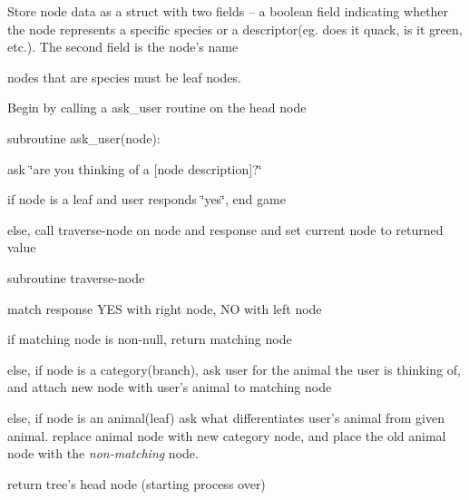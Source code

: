 \begin{DoxyItemize}
\item Store node data as a struct with two fields -- a boolean field indicating whether the node represents a specific species or a descriptor(eg. does it quack, is it green, etc.). The second field is the node's name
\begin{DoxyItemize}
\item nodes that are species must be leaf nodes.
\end{DoxyItemize}
\item Begin by calling a {\ttfamily ask\+\_\+user} routine on the head node
\item subroutine {\ttfamily ask\+\_\+user(node)}\+:
\begin{DoxyItemize}
\item ask \char`\"{}are you thinking of a \mbox{[}node description\mbox{]}?\char`\"{}
\item if node is a leaf and user responds \char`\"{}yes\char`\"{}, end game
\item else, call {\ttfamily traverse-\/node} on node and response and set current node to returned value
\end{DoxyItemize}
\item subroutine {\ttfamily traverse-\/node}
\begin{DoxyItemize}
\item match response Y\+E\+S with right node, N\+O with left node
\item if matching node is non-\/null, return matching node
\item else, if node is a category(branch), ask user for the animal the user is thinking of, and attach new node with user's animal to matching node
\item else, if node is an animal(leaf) ask what differentiates user's animal from given animal. replace animal node with new category node, and place the old animal node with the {\itshape non-\/matching} node.
\item return tree's head node (starting process over) 
\end{DoxyItemize}
\end{DoxyItemize}